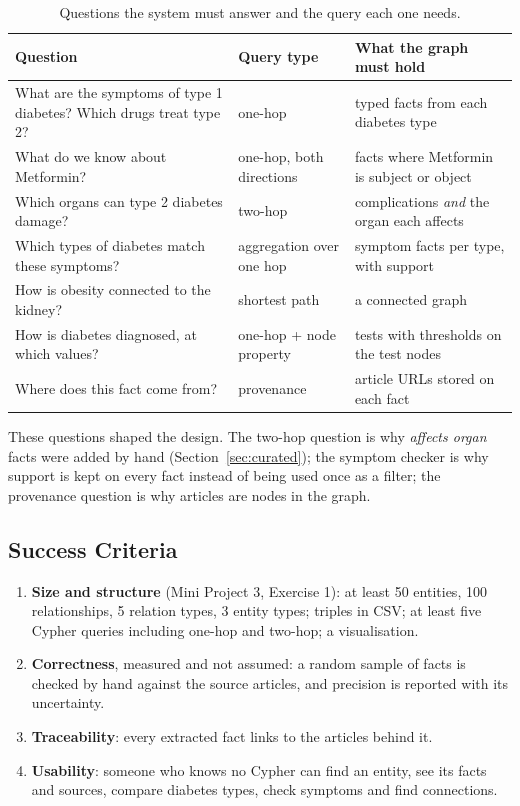 \documentclass[11pt, a4paper]{article}
\begin{document}
\begin{table}[H]
\centering
\small
\caption{Questions the system must answer and the query each one needs.}
\label{tab:questions}
\begin{tabularx}{\textwidth}{X l X}
\toprule
Question & Query type & What the graph must hold \\
\midrule
What are the symptoms of type 1 diabetes? Which drugs treat type 2? & one-hop & typed facts from each diabetes type \\
What do we know about Metformin? & one-hop, both directions & facts where Metformin is subject or object \\
Which organs can type 2 diabetes damage? & two-hop & complications \emph{and} the organ each affects \\
Which types of diabetes match these symptoms? & aggregation over one hop & symptom facts per type, with support \\
How is obesity connected to the kidney? & shortest path & a connected graph \\
How is diabetes diagnosed, at which values? & one-hop + node property & tests with thresholds on the test nodes \\
Where does this fact come from? & provenance & article URLs stored on each fact \\
\bottomrule
\end{tabularx}
\end{table}

These questions shaped the design. The two-hop question is why \emph{affects organ} facts were added by hand (Section~\ref{sec:curated}); the symptom checker is why support is kept on every fact instead of being used once as a filter; the provenance question is why articles are nodes in the graph.

\subsection{Success Criteria}

\begin{enumerate}
    \item \textbf{Size and structure} (Mini Project 3, Exercise 1): at least 50 entities, 100 relationships, 5 relation types, 3 entity types; triples in CSV; at least five Cypher queries including one-hop and two-hop; a visualisation.
    \item \textbf{Correctness}, measured and not assumed: a random sample of facts is checked by hand against the source articles, and precision is reported with its uncertainty.
    \item \textbf{Traceability}: every extracted fact links to the articles behind it.
    \item \textbf{Usability}: someone who knows no Cypher can find an entity, see its facts and sources, compare diabetes types, check symptoms and find connections.
\end{enumerate}
\end{document}
